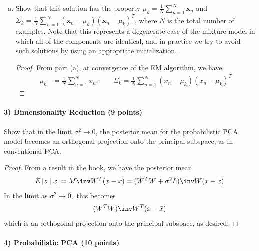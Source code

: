 \documentclass{article}
\begin{document}
\begin{enumerate}[(a)]
	\item Show that this solution has the property $\mu_k=\frac{1}{N}\sum_{n=1}^{N}\mathbf{x}_n$ and $\Sigma_k=\frac{1}{N}\sum_{n=1}^{N}(\mathbf{x}_n-\mu_k)(\mathbf{x}_n-\mu_k)^T$, where $N$ is the total number of examples. Note that this represents a degenerate case of the mixture model in which all of the components are identical, and in practice we try to avoid such solutions by using an appropriate initialization.
		\begin{proof}
			From part (a), at convergence of the EM algorithm, we have
			\begin{align*}
				\mu_k &= \frac{1}{N}\sum_{n=1}^{N} x_n, \quad\quad \Sigma_k = \frac{1}{N} \sum_{n=1}^{N} \left( x_n-\mu_k \right)\left( x_n-\mu_k \right)^T
			\end{align*}
		\end{proof}

\end{enumerate}

\newpage
\paragraph{3) Dimensionality Reduction (9 points)}

Show that in the limit $\sigma^2 \rightarrow 0$, the posterior mean for the probabilistic PCA model becomes an orthogonal projection onto the principal subspace, as in conventional PCA.
\begin{proof}
	From a result in the book, we have the posterior mean
	\begin{align*}
		E\left[ z\mid x \right] = M\inv W^T(x-\bar x) = (W^TW+\sigma^2L)\inv W(x-\bar x)
	\end{align*}
	In the limit as $\sigma^2\to 0,$ this becomes
	\begin{align*}
		(W^TW)\inv W^T(x-\bar x)
	\end{align*}
	which is an orthogonal projection onto the principal subspace, as desired.
\end{proof}


\newpage
\paragraph{4) Probabilistic PCA (10 points)}
\end{document}
